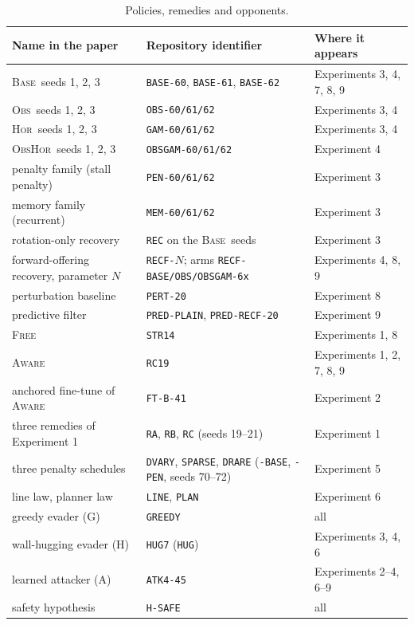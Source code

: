 \documentclass{l4dc2027}
\newcommand{\Base}{\textsc{Base}}
\newcommand{\Obs}{\textsc{Obs}}
\newcommand{\Hor}{\textsc{Hor}}
\newcommand{\ObsHor}{\textsc{ObsHor}}
\newcommand{\Free}{\textsc{Free}}
\newcommand{\Aware}{\textsc{Aware}}
\begin{document}
\begin{table}[h]
\centering\footnotesize
\caption{Policies, remedies and opponents.}
\label{tab:names}
\scriptsize\setlength{\tabcolsep}{4pt}
\begin{tabular}{@{}lll@{}}
\toprule
Name in the paper & Repository identifier & Where it appears \\
\midrule
\Base\ seeds 1, 2, 3 & \texttt{BASE-60}, \texttt{BASE-61}, \texttt{BASE-62} & Experiments 3, 4, 7, 8, 9 \\
\Obs\ seeds 1, 2, 3 & \texttt{OBS-60/61/62} & Experiments 3, 4 \\
\Hor\ seeds 1, 2, 3 & \texttt{GAM-60/61/62} & Experiments 3, 4 \\
\ObsHor\ seeds 1, 2, 3 & \texttt{OBSGAM-60/61/62} & Experiment 4 \\
penalty family (stall penalty) & \texttt{PEN-60/61/62} & Experiment 3 \\
memory family (recurrent) & \texttt{MEM-60/61/62} & Experiment 3 \\
rotation-only recovery & \texttt{REC} on the \Base\ seeds & Experiment 3 \\
forward-offering recovery, parameter $N$ & \texttt{RECF-}$N$; arms \texttt{RECF-BASE/OBS/OBSGAM-6x} & Experiments 4, 8, 9 \\
perturbation baseline & \texttt{PERT-20} & Experiment 8 \\
predictive filter & \texttt{PRED-PLAIN}, \texttt{PRED-RECF-20} & Experiment 9 \\
\Free & \texttt{STR14} & Experiments 1, 8 \\
\Aware & \texttt{RC19} & Experiments 1, 2, 7, 8, 9 \\
anchored fine-tune of \Aware & \texttt{FT-B-41} & Experiment 2 \\
three remedies of Experiment 1 & \texttt{RA}, \texttt{RB}, \texttt{RC} (seeds 19--21) & Experiment 1 \\
three penalty schedules & \texttt{DVARY}, \texttt{SPARSE}, \texttt{DRARE} (\texttt{-BASE}, \texttt{-PEN}, seeds 70--72) & Experiment 5 \\
line law, planner law & \texttt{LINE}, \texttt{PLAN} & Experiment 6 \\
greedy evader (G) & \texttt{GREEDY} & all \\
wall-hugging evader (H) & \texttt{HUG7} (\texttt{HUG}) & Experiments 3, 4, 6 \\
learned attacker (A) & \texttt{ATK4-45} & Experiments 2--4, 6--9 \\
safety hypothesis & \texttt{H-SAFE} & all \\
\bottomrule
\end{tabular}
\end{table}
\end{document}
